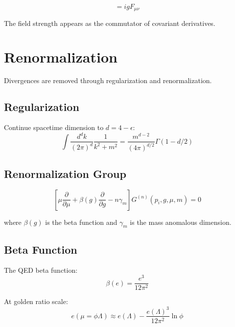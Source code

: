 \begin{proposition}
\label{fa_21:prop:non-abelian}
\begin{equation}
[D_\mu, D_\nu] = igF_{\mu\nu}
\end{equation}

The field strength appears as the commutator of covariant derivatives.
\end{proposition}

\section{Renormalization}

Divergences are removed through regularization and renormalization.

\subsection{Regularization}

\begin{definition}
\label{fa_21:def:dim-reg}
Continue spacetime dimension to $d = 4 - \epsilon$:
\begin{equation}
\int \frac{d^dk}{(2\pi)^d} \frac{1}{k^2 + m^2} = \frac{m^{d-2}}{(4\pi)^{d/2}} \Gamma(1-d/2)
\end{equation}
\end{definition}

\subsection{Renormalization Group}

\begin{theorem}[RG Equation]
\label{fa_21:thm:rg}
\begin{equation}
\left[\mu\frac{\partial}{\partial\mu} + \beta(g)\frac{\partial}{\partial g} - n\gamma_m\right] G^{(n)}(p_i,g,\mu,m) = 0
\end{equation}

where $\beta(g)$ is the beta function and $\gamma_m$ is the mass anomalous dimension.
\end{theorem}

\subsection{Beta Function}

\begin{proposition}
\label{fa_21:prop:beta-golden}
The QED beta function:
\begin{equation}
\beta(e) = \frac{e^3}{12\pi^2}
\end{equation}

At golden ratio scale:
\begin{equation}
e(\mu = \phi \Lambda) \approx e(\Lambda) - \frac{e(\Lambda)^3}{12\pi^2}\ln\phi
\end{equation}
\end{proposition}

